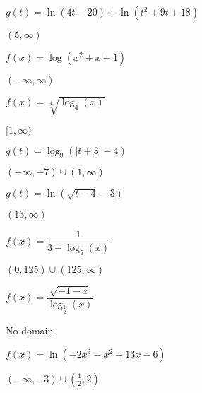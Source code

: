 \documentclass{ximera}
\begin{document}
\begin{question}
\begin{problem}
$g(t) = \ln(4t-20) + \ln\left(t^2+9t+18\right)$

\begin{solution}
    $(5, \infty)$
\end{solution}
\end{problem}

\begin{problem}
$f(x) = \log\left(x^2+x+1\right)$

\begin{solution}
$(-\infty, \infty)$
\end{solution}
\end{problem}

\begin{problem}
$f(x) = \sqrt[4]{\log_{4} (x)}$

\begin{solution}
    $[1, \infty)$
\end{solution}
\end{problem}

\begin{problem}
$g(t) = \log_{9}(|t + 3| - 4)$

\begin{solution}
    $(-\infty, -7) \cup (1, \infty)$
\end{solution}
\end{problem}

\begin{problem}
$g(t) = \ln(\sqrt{t - 4} - 3)$

\begin{solution}
$(13, \infty)$
\end{solution}
\end{problem}

\begin{problem}
$f(x) = \dfrac{1}{3 - \log_{5} (x)}$

\begin{solution}
    $(0, 125) \cup (125, \infty)$
\end{solution}
\end{problem}

\begin{problem}
$f(x) = \dfrac{\sqrt{-1 - x}}{\log_{\frac{1}{2}} (x)}$

\begin{solution}
    No domain
\end{solution}
\end{problem}

\begin{problem}\label{domainloglast}
$f(x) = \ln(-2x^{3} - x^{2} + 13x - 6)$  

\begin{solution}
$(-\infty, -3) \cup \left(\frac{1}{2}, 2\right)$
\end{solution}
\end{problem}

\end{question}
\end{document}
